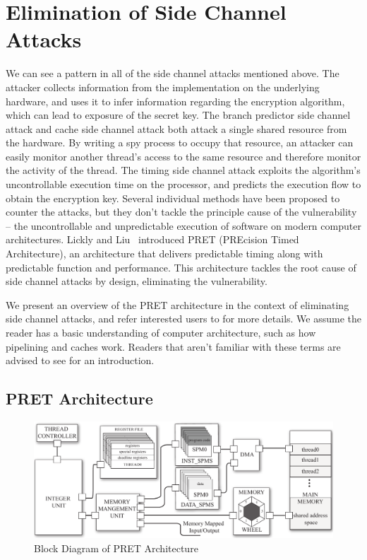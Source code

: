 \documentclass[times, 10pt,twocolumn]{article}
\begin{document}
\section{Elimination of Side Channel Attacks}
We can see a pattern in all of the side channel attacks mentioned above. The attacker collects information from the implementation on the underlying hardware, and uses it to infer information regarding the encryption algorithm, which can lead to exposure of the secret key. The branch predictor side channel attack and cache side channel attack both attack a single shared resource from the hardware. By writing a spy process to occupy that resource, an attacker can easily monitor another thread's access to the same resource and therefore monitor the activity of the thread. The timing side channel attack exploits the algorithm's uncontrollable execution time on the processor, and predicts the execution flow to obtain the encryption key. Several individual methods have been proposed to counter the attacks, but they don't tackle the principle cause of the vulnerability -- the uncontrollable and unpredictable execution of software on modern computer architectures. Lickly and Liu~\cite{pret_cases08} introduced PRET (PREcision Timed Architecture), an architecture that delivers predictable timing along with predictable function and performance. This architecture tackles the root cause of side channel attacks by design, eliminating the vulnerability.

We present an overview of the PRET architecture in the context of eliminating side channel attacks, and refer interested users to \cite{pret_cases08} for more details. We assume the reader has a basic understanding of computer architecture, such as how pipelining and caches work. Readers that aren't familiar with these terms are advised to see \cite{patterson2005coa} for an introduction.

\subsection{PRET Architecture}

\begin{figure}[ht]
  \centering
  \includegraphics[scale=.25]{./images/top_arch.pdf}
  \caption{Block Diagram of PRET Architecture}
  \label{fig:top_arch}
\end{figure}
\end{document}
